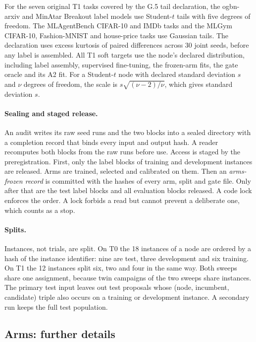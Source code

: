 For the seven original T1 tasks covered by the G.5 tail declaration, the ogbn-arxiv and MinAtar Breakout label models use Student-$t$ tails with five degrees of freedom. The MLAgentBench CIFAR-10 and IMDb tasks and the MLGym CIFAR-10, Fashion-MNIST and house-price tasks use Gaussian tails. The declaration uses excess kurtosis of paired differences across 30 joint seeds, before any label is assembled. All T1 soft targets use the node's declared distribution, including label assembly, supervised fine-tuning, the frozen-arm fits, the gate oracle and its A2 fit. For a Student-$t$ node with declared standard deviation $s$ and $\nu$ degrees of freedom, the scale is $s\sqrt{(\nu-2)/\nu}$, which gives standard deviation $s$. 

\paragraph{Sealing and staged release.}
An audit writes its raw seed runs and the two blocks into a sealed directory with a completion record that binds every input and output hash. A reader recomputes both blocks from the raw runs before use. Access is staged by the preregistration. First, only the label blocks of training and development instances are released. Arms are trained, selected and calibrated on them. Then an \emph{arms-frozen record} is committed with the hashes of every arm, split and gate file. Only after that are the test label blocks and all evaluation blocks released. A code lock enforces the order. A lock forbids a read but cannot prevent a deliberate one, which counts as a stop.

\paragraph{Splits.}
Instances, not trials, are split. On T0 the 18 instances of a node are ordered by a hash of the instance identifier: nine are test, three development and six training. On T1 the 12 instances split six, two and four in the same way. Both sweeps share one assignment, because twin campaigns of the two sweeps share instances. The primary test input leaves out test proposals whose (node, incumbent, candidate) triple also occurs on a training or development instance. A secondary run keeps the full test population.

\subsection{Arms: further details}
\label{app:arms}

